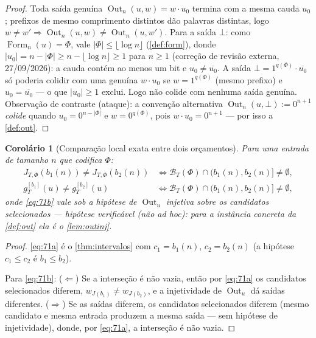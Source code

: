 \documentclass[11pt,a4paper]{article}
\newtheorem{corollary}[theorem]{Corolário}
\theoremstyle{definition}
\theoremstyle{remark}
\newcommand{\Fm}{\operatorname{Form}}
\newcommand{\Out}{\operatorname{Out}}
\begin{document}
\begin{proof}
Toda sa\'{i}da genu\'{i}na $\Out_n(u,w) = w \cdot u_0$ termina com a mesma
cauda $u_0$; prefixos de mesmo comprimento distintos d\~{a}o palavras
distintas, logo $w \neq w' \Rightarrow \Out_n(u,w) \neq \Out_n(u,w')$.
Para a sa\'{i}da $\bot$: como $\Fm_n(u) = \Phi$, vale
$|\Phi| \leq \lfloor \log n \rfloor$ (\cref{def:form}), donde
$|u_0| = n - |\Phi| \geq n - \lfloor \log n \rfloor \geq 1$ para $n \geq 1$
(correção de revisão externa, 27/09/2026): a cauda contém ao menos um bit e
$u_0 \neq \overline{u_0}$. A sa\'{i}da $\bot = 1^{q(\Phi)} \cdot
\overline{u_0}$ s\'{o} poderia colidir com uma genu\'{i}na $w \cdot u_0$ se
$w = 1^{q(\Phi)}$ (mesmo prefixo) e $u_0 = \overline{u_0}$ --- o que
$|u_0| \geq 1$ exclui. Logo n\~{a}o colide com nenhuma sa\'{i}da genu\'{i}na. Observação de contraste (ataque): a convenção alternativa
$\Out_n(u,\bot) := 0^{n+1}$ \emph{colide} quando $u_0 = 0^{n-|\Phi|}$ e
$w = 0^{q(\Phi)}$, pois $w \cdot u_0 = 0^{n+1}$ — por isso a
\cref{def:out}.
\end{proof}

\begin{corollary}[Compara\c{c}\~{a}o local exata entre dois or\c{c}amentos]\label{cor:comparacao}
Para uma entrada de tamanho $n$ que codifica $\Phi$:
\begin{align}
  J_{T,\Phi}(b_1(n)) \neq J_{T,\Phi}(b_2(n))
  &\iff \mathcal{B}_T(\Phi) \cap \bigl(b_1(n), b_2(n)\bigr] \neq \emptyset,
  \label{eq:71a}\\
  g_T^{[b_1]}(u) \neq g_T^{[b_2]}(u)
  &\iff \mathcal{B}_T(\Phi) \cap \bigl(b_1(n), b_2(n)\bigr] \neq \emptyset,
  \label{eq:71b}
\end{align}
onde \eqref{eq:71b} vale sob a hipótese de $\Out_u$ injetiva sobre os candidatos
selecionados — hipótese \emph{verificável} (não ad hoc): para a instância
concreta da \cref{def:out} ela é o \cref{lem:outinj}.
\end{corollary}

\begin{proof}
\eqref{eq:71a} é o \cref{thm:intervalos} com $c_1 = b_1(n)$,
$c_2 = b_2(n)$ (a hipótese $c_1 \leq c_2$ é $b_1 \leq b_2$).

Para \eqref{eq:71b}: ($\Leftarrow$) Se a interseção é não vazia, então por
\eqref{eq:71a} os candidatos selecionados diferem,
$w_{J(b_1)} \neq w_{J(b_2)}$, e a injetividade de $\Out_u$ dá saídas diferentes.
($\Rightarrow$) Se as saídas diferem, os candidatos selecionados diferem
(mesmo candidato e mesma entrada produzem a mesma saída — sem hipótese de
injetividade), donde, por \eqref{eq:71a}, a interseção é não vazia.
\end{proof}
\end{document}
